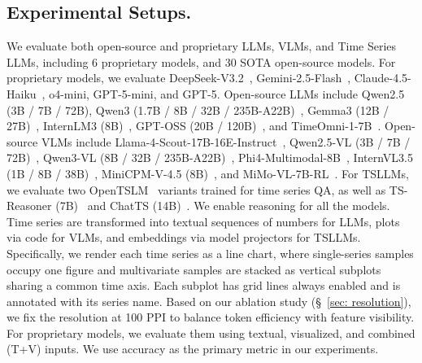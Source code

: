 \documentclass{article}
\theoremstyle{plain}
\theoremstyle{definition}
\theoremstyle{remark}
\theoremstyle{plain}
\begin{document}
\subsection{Experimental Setups.} We evaluate both open-source and proprietary LLMs, VLMs, and Time Series LLMs, including 6 proprietary models, and 30 SOTA open-source models. For proprietary models, we evaluate DeepSeek-V3.2~\citep{guo2025deepseek}, Gemini-2.5-Flash~\citep{comanici2025gemini}, Claude-4.5-Haiku~\citep{Anthropic2025Claude3.7Sonnet}, o4-mini, GPT-5-mini, and GPT-5. Open-source LLMs include Qwen2.5 (3B / 7B / 72B), Qwen3 (1.7B / 8B / 32B / 235B-A22B)~\citep{yang2025qwen3}, Gemma3 (12B / 27B)~\citep{team2025gemma}, InternLM3 (8B)~\citep{cai2024internlm2}, GPT-OSS (20B / 120B)~\citep{agarwal2025gpt}, and TimeOmni-1-7B~\citep{guan2025timeomni}. 
Open-source VLMs include Llama-4-Scout-17B-16E-Instruct~\citep{Meta2025Llama4Multimodal}, Qwen2.5-VL (3B / 7B / 72B)~\citep{bai2025qwen2}, Qwen3-VL (8B / 32B / 235B-A22B)~\citep{yang2025qwen3}, Phi4-Multimodal-8B~\citep{abouelenin2025phi}, InternVL3.5 (1B / 8B / 38B)~\citep{wang2025internvl3}, MiniCPM-V-4.5 (8B)~\citep{yao2024minicpm}, and MiMo-VL-7B-RL~\citep{coreteam2025mimovltechnicalreport}. For TSLLMs, we evaluate two OpenTSLM~\citep{langer2025opentslm} variants trained for time series QA, as well as TS-Reasoner (7B)~\citep{yu2025ts} and ChatTS (14B)~\citep{xie2024chatts}. We enable reasoning for all the models. Time series are transformed into textual sequences of numbers for LLMs, plots via code for VLMs, and embeddings via model projectors for TSLLMs. Specifically, we render each time series as a line chart, where single-series samples occupy one figure and multivariate samples are stacked as vertical subplots sharing a common time axis. Each subplot has grid lines always enabled and is annotated with its series name. Based on our ablation study (\S~\ref{sec: resolution}), we fix the resolution at 100 PPI to balance token efficiency with feature visibility.
For proprietary models, we evaluate them using textual, visualized, and combined (T+V) inputs.
We use accuracy as the primary metric in our experiments.  
\end{document}
